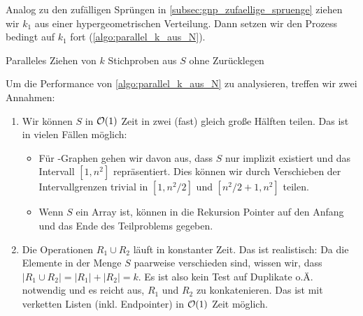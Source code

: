 Analog zu den zufälligen Sprüngen in \cref{subsec:gnp_zufaellige_spruenge} ziehen wir $k_1$ aus einer hypergeometrischen Verteilung.
Dann setzen wir den Prozess bedingt auf $k_1$ fort (\cref{algo:parallel_k_aus_N}).

\begin{algorithm}
    \caption{Paralleles Ziehen von $k$ Stichproben aus $S$ ohne Zurücklegen}
    \label{algo:parallel_k_aus_N}
\end{algorithm}

\goodbreak

\noindent
Um die Performance von \cref{algo:parallel_k_aus_N} zu analysieren, treffen wir zwei Annahmen:
\begin{enumerate}
    \item Wir können $S$ in $\mathcal{O}\!\left(1\right)$ Zeit in zwei (fast) gleich große Hälften teilen.
          Das ist in vielen Fällen möglich:
          \begin{itemize}
              \item Für \Gnm-Graphen gehen wir davon aus, dass $S$ nur implizit existiert und das Intervall $[1, n^2]$ repräsentiert.
                    Dies können wir durch Verschieben der Intervallgrenzen trivial in $[1, n^2 / 2]$ und $[n^2/2 + 1, n^2]$ teilen.
              \item Wenn $S$ ein Array ist, können in die Rekursion Pointer auf den Anfang und das Ende des Teilproblems gegeben.
          \end{itemize}

    \item Die Operationen $R_1 \cup R_2$ läuft in konstanter Zeit.
          Das ist realistisch: Da die Elemente in der Menge $S$ paarweise verschieden sind, wissen wir, dass $|R_1 \cup R_2| = |R_1| + |R_2| = k$.
          Es ist also kein Test auf Duplikate o.Ä. notwendig und es reicht aus, $R_1$ und $R_2$ zu konkatenieren.
          Das ist mit verketten Listen (inkl. Endpointer) in $\mathcal{O}\!\left(1\right)$ Zeit möglich.
\end{enumerate}

